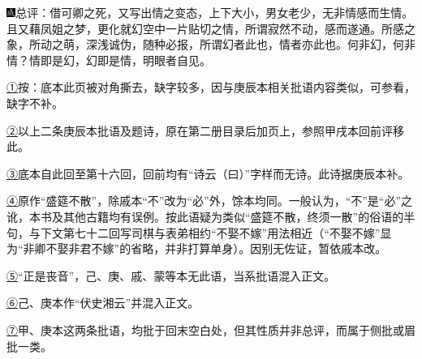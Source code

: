 {\includegraphics[width=3mm]{../Images/00005}总评：借可卿之死，又写出情之变态，上下大小，男女老少，无非情感而生情。且又藉凤姐之梦，更化就幻空中一片贴切之情，所谓寂然不动，感而遂通。所感之象，所动之萌，深浅诚伪，随种必报，所谓幻者此也，情者亦此也。何非幻，何非情？情即是幻，幻即是情，明眼者自见。}

{\href{../Text/part0017_split_000.html\#navto_1_a}{①}按：底本此页被对角撕去，缺字较多，因与庚辰本相关批语内容类似，可参看，缺字不补。}

{\href{../Text/part0017_split_000.html\#navto_2_a}{②}以上二条庚辰本批语及题诗，原在第二册目录后加页上，参照甲戌本回前评移此。}

{\href{../Text/part0017_split_000.html\#navto_3_a}{③}底本自此回至第十六回，回前均有``诗云（曰）''字样而无诗。此诗据庚辰本补。}

{\href{../Text/part0017_split_000.html\#navto_4_a}{④}原作``盛筵不散''，除戚本``不''改为``必''外，馀本均同。一般认为，``不''是``必''之讹，本书及其他古籍均有误例。按此语疑为类似``盛筵不散，终须一散''的俗语的半句，与下文第七十二回写司棋与表弟相约``不娶不嫁''用法相近（``不娶不嫁''显为``非卿不娶非君不嫁''的省略，并非打算单身）。因别无佐证，暂依戚本改。}

{\href{../Text/part0017_split_000.html\#navto_5_a}{⑤}``正是丧音''，己、庚、戚、蒙等本无此语，当系批语混入正文。}

{\href{../Text/part0017_split_000.html\#navto_6_a}{⑥}己、庚本作``伏史湘云''并混入正文。}

{\href{../Text/part0017_split_000.html\#navto_7_a}{⑦}甲、庚本这两条批语，均批于回末空白处，但其性质并非总评，而属于侧批或眉批一类。}
